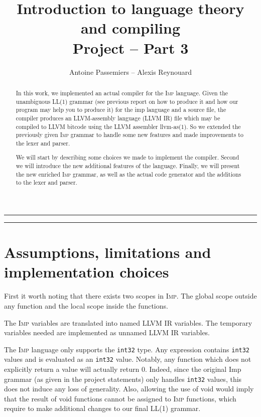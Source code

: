 \documentclass[11pt]{article}
\title{Introduction to language theory and compiling \\ Project -- Part 3}
\author{Antoine Passemiers -- Alexis Reynouard}
\newcommand\imp{\textsc{Imp}\xspace}
\newcommand\inttt{\texttt{int32}\xspace}
\begin{document}
\maketitle
\thispagestyle{empty}

\vfil
\begin{abstract}
In this work, we implemented an actual compiler for the \imp language.
Given the unambiguous LL(1) grammar (see previous report on how to produce it and how our program may help you
to produce it) for the imp language and a source file, 
the compiler produces an LLVM-assembly language (LLVM IR) file which may be
compiled to LLVM bitcode using the LLVM assembler \textsf{llvm-as(1)}.
So we extended the previously given \imp grammar to handle some new features
and made improvements to the lexer and parser.

We will start by describing some choices we made to implement the compiler.
Second we will introduce the new additional features of the language.
Finally, we will present the new enriched \imp grammar,
as well as the actual code generator and the additions to the lexer and parser.
\end{abstract}

\clearpage
\vfill
\hrule
\vspace{\baselineskip}
\tableofcontents
\vspace{3\baselineskip}
\hrule
\vfill
\clearpage

\setcounter{page}{1}

\section{Assumptions, limitations and implementation choices}

First it worth noting that there exists two scopes in \imp.
The global scope outside any function and the local scope inside the functions.

The \imp variables are translated into named LLVM IR variables.
The temporary variables needed are implemented as unnamed LLVM IR variables.

The \imp language only supports the \inttt type.
Any expression contains \inttt values and is evaluated as an \inttt value.
Notably, any function which does not explicitly return a value will actually return 0.
Indeed, since the original Imp grammar (as given in the project statements) only handles
\inttt values, this does not induce any loss of generality. Also, allowing the use
of void would imply that the result of void functions cannot be assigned to \imp functions,
which require to make additional changes to our final LL(1) grammar.
\end{document}
